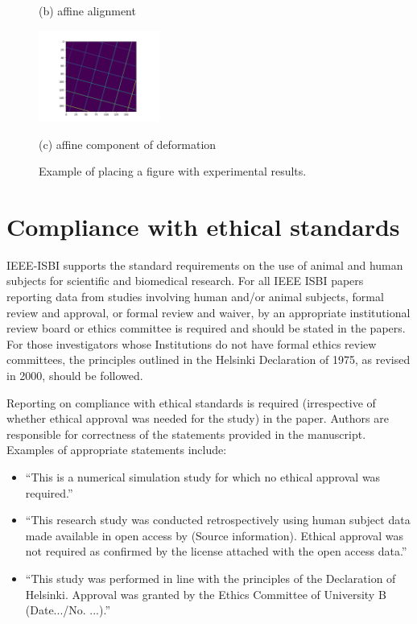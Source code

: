 \documentclass{article}
\begin{document}
\begin{figure}[htb]
\begin{minipage}[b]{.48\linewidth}
  \centerline{(b) affine alignment}\medskip
\end{minipage}
\hfill
\begin{minipage}[b]{0.48\linewidth}
  \centering
  \centerline{\includegraphics[width=4.0cm]{knee_affine-31/005_.png}}
  \centerline{(c) affine component of deformation}\medskip
\end{minipage}
\caption{Example of placing a figure with experimental results.}
\label{fig:res}
%
\end{figure}

\vfill
\pagebreak



\section{Compliance with ethical standards}
\label{sec:ethics}

IEEE-ISBI supports the standard requirements on the use of animal and
human subjects for scientific and biomedical research. For all IEEE
ISBI papers reporting data from studies involving human and/or
animal subjects, formal review and approval, or formal review and
waiver, by an appropriate institutional review board or ethics
committee is required and should be stated in the papers. For those
investigators whose Institutions do not have formal ethics review
committees, the principles  outlined in the Helsinki Declaration of
1975, as revised in 2000, should be followed.

Reporting on compliance with ethical standards is required
(irrespective of whether ethical approval was needed for the study) in
the paper. Authors are responsible for correctness of the statements
provided in the manuscript. Examples of appropriate statements
include:
\begin{itemize}
  \item ``This is a numerical simulation study for which no ethical
    approval was required.'' 
  \item ``This research study was conducted retrospectively using
    human subject data made available in open access by (Source
    information). Ethical approval was not required as confirmed by
    the license attached with the open access data.''
    \item ``This study was performed in line with the principles of
      the Declaration of Helsinki. Approval was granted by the Ethics
      Committee of University B (Date.../No. ...).''
\end{itemize}




\end{document}
